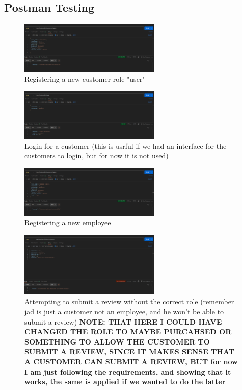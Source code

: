 \documentclass[a4paper,12pt]{article}
\begin{document}
\subsection{Postman Testing}
\begin{figure}[H]
  \centering
  \includegraphics[width=0.6\textwidth]{images/22.png}
  \caption{Registering a new customer role "user"}
\end{figure}
\begin{figure}[H]
  \centering
  \includegraphics[width=0.6\textwidth]{images/23.png}
  \caption{Login for a customer (this is usrful if we had an interface for the customers to login, but for now it is not used)}
\end{figure}
\begin{figure}[H]
  \centering
  \includegraphics[width=0.6\textwidth]{images/24.png}
  \caption{Registering a new employee}
\end{figure}
\begin{figure}[H]
  \centering
  \includegraphics[width=0.6\textwidth]{images/25.png}
  \caption{Attempting to submit a review without the correct role (remember jad is just a customer not an employee, and he won't be able to submit a review) \textbf{NOTE: THAT HERE I COULD HAVE CHANGED THE ROLE TO MAYBE PURCAHSED OR SOMETHING TO ALLOW THE CUSTOMER TO SUBMIT A REVIEW, SINCE IT MAKES SENSE THAT A CUSTOMER CAN SUBMIT A REVIEW, BUT for now I am just following the requirements, and showing that it works, the same is applied if we wanted to do the latter}}
\end{figure}
\end{document}
